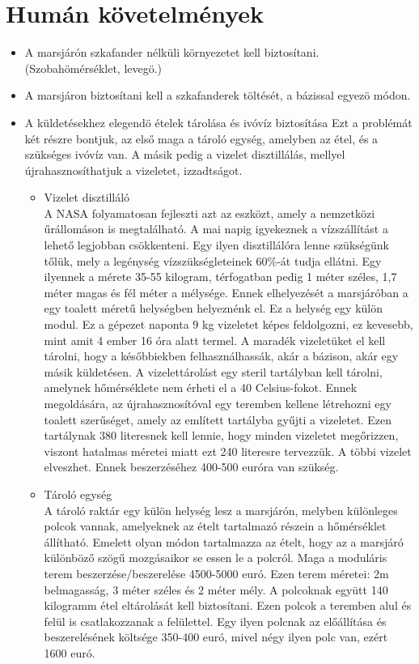 \documentclass[12pt]{report}
\begin{document}
\section{Humán követelmények}
\begin{itemize}
  \item {} A marsjárón szkafander nélküli környezetet kell biztosítani. (Szobahömérséklet, levegö.)
  \item {} A marsjáron biztosítani kell a szkafanderek töltését, a bázissal egyezö módon.
  \item {} A küldetésekhez elegendö ételek tárolása és ivóvíz biztosítása
  Ezt a problémát két részre bontjuk, az első maga a tároló egység, amelyben az étel, és a szükséges ivóvíz van.  A másik pedig a vizelet disztillálás, mellyel újrahasznosíthatjuk a vizeletet, izzadtságot. 
  \begin{itemize}
    \item Vizelet disztilláló  \\ 
    A NASA folyamatosan fejleszti azt az eszközt, amely a nemzetközi űrállomáson is megtalálható. A mai napig igyekeznek a vízszállítást a lehető legjobban csökkenteni. Egy ilyen disztillálóra lenne szükségünk tőlük, mely a legénység vízszükségleteinek 60\%-át tudja ellátni.
    Egy ilyennek a mérete 35-55 kilogram, térfogatban pedig 1 méter széles, 1,7 méter magas és fél méter a mélysége.
    Ennek elhelyezését a marsjáróban a egy toalett méretű helységben helyeznénk el. Ez a helység egy külön modul.
    Ez a gépezet naponta 9 kg vizeletet képes feldolgozni, ez kevesebb, mint amit 4 ember 16 óra alatt termel. A maradék vizeletüket el kell tárolni, hogy a későbbiekben felhasználhassák, akár a bázison, akár egy másik küldetésen. A vizelettárolást egy steril tartályban kell tárolni, amelynek hőmérséklete nem érheti el a 40 Celsius-fokot. Ennek megoldására, az újrahasznosítóval egy teremben kellene létrehozni egy toalett szerűséget, amely az említett tartályba gyűjti a vizeletet. Ezen tartálynak 380 literesnek kell lennie, hogy minden vizeletet megőrizzen, viszont hatalmas méretei miatt ezt 240 literesre tervezzük. A többi vizelet elveszhet. Ennek beszerzéséhez 400-500 euróra van szükség.
    \item Tároló egység  \\ 
    A tároló raktár egy külön helység lesz a marsjárón, melyben különleges polcok vannak, amelyeknek az ételt tartalmazó részein a hőmérséklet állítható. Emelett olyan módon tartalmazza az ételt, hogy az a marsjáró különböző szögű mozgásaikor se essen le a polcról. Maga a moduláris terem beszerzése/beszerelése 4500-5000 euró. Ezen terem méretei: 2m belmagasság, 3 méter széles és 2 méter mély. A polcoknak együtt 140 kilogramm étel eltárolását kell biztosítani. Ezen polcok a teremben alul és felül is csatlakozzanak a felülettel. Egy ilyen polcnak az előállítása és beszerelésének költsége 350-400 euró, mivel négy ilyen polc van, ezért 1600 euró. \\

\end{itemize}
\end{itemize}
\end{document}
